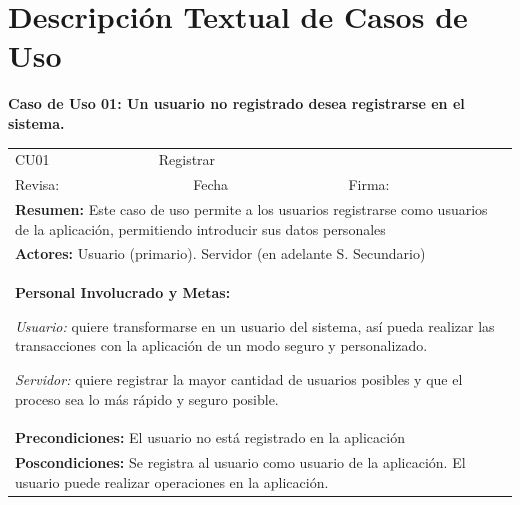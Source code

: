 	\section{Descripción Textual de Casos de Uso}
		\textbf{Caso de Uso 01: Un usuario no registrado desea registrarse en el sistema.}
			\begin{longtable}{|l|p{5.5cm}|l|p{2cm}|l|p{1.9cm}|} \hline
					\cellcolor{grisOscuro} CU01 & \multicolumn{4}{|l|}{  \cellcolor{grisOscuro} Registrar} &  \cellcolor{grisClaro}\multirow{2}{1cm}{} \\ \cline{1-5}
					\cellcolor{grisOscuro} Revisa: &  \cellcolor{grisClaro} &  \cellcolor{grisOscuro} Fecha &  \cellcolor{grisClaro} &  \cellcolor{grisOscuro} Firma: & \cellcolor{grisClaro} \\ \hline
					\multicolumn{6}{|p{15cm}|}{ \textbf{Resumen: } Este caso de uso permite a los usuarios registrarse como usuarios de la aplicación, permitiendo introducir sus datos personales

					} \\ \hline

					\multicolumn{6}{|p{15cm}|}{ \textbf{Actores: } Usuario (primario). Servidor (en adelante S. Secundario)

					} \\ \hline

					\multicolumn{6}{|p{15cm}|}{ \textbf{Personal Involucrado y Metas: }
					
					\emph{Usuario:} quiere transformarse en un usuario del sistema, así pueda realizar las transacciones con la aplicación de un modo seguro y personalizado.
					
					\emph{Servidor: } quiere registrar la mayor cantidad de usuarios posibles y que el proceso sea lo más rápido y seguro posible.
					} \\ \hline

					\multicolumn{6}{|p{15cm}|}{ \textbf{Precondiciones: } El usuario no está registrado en la aplicación

					} \\ \hline

					\multicolumn{6}{|p{15cm}|}{ \textbf{Poscondiciones: } Se registra al usuario como usuario de la aplicación. El usuario puede realizar operaciones en la aplicación.

					} \\ \hline


\end{longtable}
